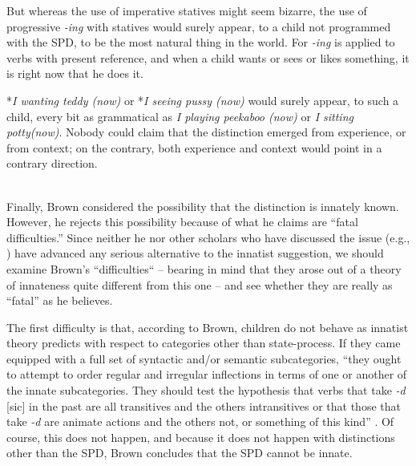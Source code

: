 But whereas the use of imperative statives might seem bizarre, the use of progressive \textit{-ing} with statives would surely appear, to a child not programmed with the SPD, to be the most natural thing in the world. For \textit{-ing} is applied to verbs with present reference, and when a child wants or sees or likes something, it is right now that he does it.

*\textit{I wanting teddy (now)} or *\textit{I seeing pussy (now)} would surely appear, to such a child, every bit as grammatical as \textit{I playing peekaboo (now)} or \textit{I sitting potty(now)}. Nobody could claim that the distinction emerged from experience, or from context; on the contrary, both experience and context would point in a contrary direction.\\\\

Finally, Brown considered the possibility that the distinction is innately known. However, he rejects this possibility because of what he claims are ``fatal difficulties.'' Since neither he nor other scholars who have discussed the issue (e.g., \citealt{Kuczaj1978,Fletcher1979}) have advanced any serious alternative to the innatist suggestion, we should examine Brown's ``difficulties`` -- bearing in mind that they arose out of a theory of innateness quite different from this one -- and see whether they are really as ``fatal'' as he believes.

The first difficulty is that, according to Brown, children do not behave as innatist theory predicts with respect to categories other than state-process. If they came equipped with a full set of syntactic and/or semantic subcategories, ``they ought to attempt to order regular and irregular inflections in terms of one or another of the innate subcategories. They should test the hypothesis that verbs that take \textit{-d} [sic] in the past are all transitives and the others intransitives or that those that take \textit{-d} are animate actions and the others not, or something of this kind'' \citeyear[328]{Brown1973}. Of course, this does not happen, and because it does not happen with distinctions other than the SPD, Brown concludes that the SPD cannot be innate.

